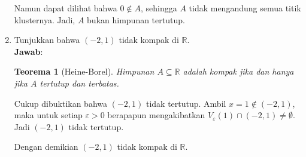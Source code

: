 \documentclass[12pt,openany,a4paper]{article}
\newtheorem*{teorema}{Teorema}
\newcommand{\R}{\mathbb{R}}
\newcommand{\jawab}{\textbf{Jawab}:}
\begin{document}
\begin{enumerate}
    Namun dapat dilihat bahwa $0\notin A$, sehingga $A$ tidak mengandung semua titik klusternya.
    Jadi, $A$ bukan himpunan tertutup.

    \item Tunjukkan bahwa $(-2,1)$ tidak kompak di $\R$.\\
    \jawab
    \begin{teorema}[Heine-Borel]
        Himpunan $A\subseteq\R$ adalah kompak jika dan hanya jika $A$ tertutup dan terbatas.
    \end{teorema}
    Cukup dibuktikan bahwa $(-2,1)$ tidak tertutup. Ambil $x=1\notin(-2,1)$, maka untuk setiap 
    $\varepsilon>0$ berapapun mengakibatkan $V_\varepsilon(1)\cap(-2,1)\ne\emptyset$. Jadi 
    $(-2,1)$ tidak tertutup.

    Dengan demikian $(-2,1)$ tidak kompak di $\R$.


\end{enumerate}
\end{document}
